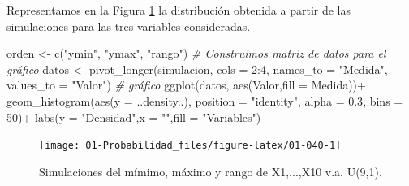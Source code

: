 \documentclass[
]{book}
\newenvironment{Shaded}{\begin{snugshade}}{\end{snugshade}}
\newcommand{\AttributeTok}[1]{\textcolor[rgb]{0.77,0.63,0.00}{#1}}
\newcommand{\CommentTok}[1]{\textcolor[rgb]{0.56,0.35,0.01}{\textit{#1}}}
\newcommand{\DecValTok}[1]{\textcolor[rgb]{0.00,0.00,0.81}{#1}}
\newcommand{\FloatTok}[1]{\textcolor[rgb]{0.00,0.00,0.81}{#1}}
\newcommand{\FunctionTok}[1]{\textcolor[rgb]{0.00,0.00,0.00}{#1}}
\newcommand{\NormalTok}[1]{#1}
\newcommand{\OtherTok}[1]{\textcolor[rgb]{0.56,0.35,0.01}{#1}}
\newcommand{\SpecialCharTok}[1]{\textcolor[rgb]{0.00,0.00,0.00}{#1}}
\newcommand{\StringTok}[1]{\textcolor[rgb]{0.31,0.60,0.02}{#1}}
\theoremstyle{definition}
\theoremstyle{definition}
\theoremstyle{definition}
\theoremstyle{definition}
\theoremstyle{remark}
\begin{document}
Representamos en la Figura \ref{fig:01-040} la distribución obtenida a partir de las simulaciones para las tres variables consideradas.

\begin{Shaded}
\begin{Highlighting}[]
\NormalTok{orden }\OtherTok{\textless{}{-}} \FunctionTok{c}\NormalTok{(}\StringTok{"ymin"}\NormalTok{, }\StringTok{"ymax"}\NormalTok{, }\StringTok{"rango"}\NormalTok{)}
\CommentTok{\# Construimos matriz de datos para el gráfico}
\NormalTok{datos }\OtherTok{\textless{}{-}} \FunctionTok{pivot\_longer}\NormalTok{(simulacion, }\AttributeTok{cols =} \DecValTok{2}\SpecialCharTok{:}\DecValTok{4}\NormalTok{, }
                      \AttributeTok{names\_to =} \StringTok{"Medida"}\NormalTok{, }\AttributeTok{values\_to =} \StringTok{"Valor"}\NormalTok{)}
\CommentTok{\# gráfico}
\FunctionTok{ggplot}\NormalTok{(datos, }\FunctionTok{aes}\NormalTok{(Valor,}\AttributeTok{fill =}\NormalTok{ Medida))}\SpecialCharTok{+}
  \FunctionTok{geom\_histogram}\NormalTok{(}\FunctionTok{aes}\NormalTok{(}\AttributeTok{y =}\NormalTok{ ..density..), }\AttributeTok{position =} \StringTok{"identity"}\NormalTok{, }\AttributeTok{alpha =} \FloatTok{0.3}\NormalTok{, }\AttributeTok{bins =} \DecValTok{50}\NormalTok{)}\SpecialCharTok{+}
  \FunctionTok{labs}\NormalTok{(}\AttributeTok{y =} \StringTok{"Densidad"}\NormalTok{,}\AttributeTok{x =} \StringTok{""}\NormalTok{,}\AttributeTok{fill =} \StringTok{"Variables"}\NormalTok{)}
\end{Highlighting}
\end{Shaded}

\begin{figure}

{\centering \texttt{[image: 01-Probabilidad\_files/figure-latex/01-040-1]} 

}

\caption{Simulaciones del mímimo, máximo y rango de X1,...,X10 v.a. U(9,1).}\label{fig:01-040}
\end{figure}
\end{document}
